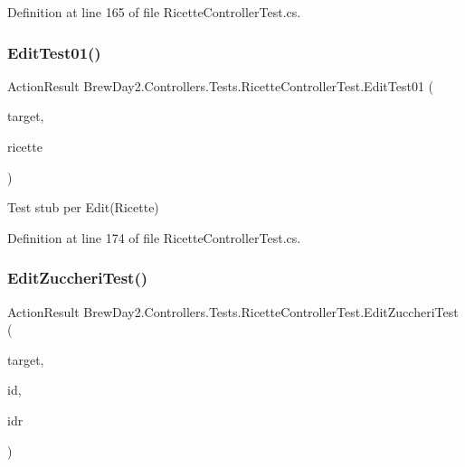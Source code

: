 Definition at line 165 of file Ricette\+Controller\+Test.\+cs.

\mbox{\label{class_brew_day2_1_1_controllers_1_1_tests_1_1_ricette_controller_test_a17ffb0513ba9d12c358fe7ef99df6918}} 
\subsubsection{\texorpdfstring{Edit\+Test01()}{EditTest01()}}
{\footnotesize\ttfamily Action\+Result Brew\+Day2.\+Controllers.\+Tests.\+Ricette\+Controller\+Test.\+Edit\+Test01 (\begin{DoxyParamCaption}\item[{\mbox{[}\+Pex\+Assume\+Under\+Test\mbox{]} \mbox{\hyperlink{class_brew_day2_1_1_controllers_1_1_ricette_controller}{Ricette\+Controller}}}]{target,  }\item[{\mbox{\hyperlink{class_brew_day2_1_1_models_1_1_ricette}{Ricette}}}]{ricette }\end{DoxyParamCaption})}



Test stub per Edit(\+Ricette)



Definition at line 174 of file Ricette\+Controller\+Test.\+cs.

\mbox{\label{class_brew_day2_1_1_controllers_1_1_tests_1_1_ricette_controller_test_ad23eef82d2d6cb0fd15d5b6dfd69e79b}} 
\subsubsection{\texorpdfstring{Edit\+Zuccheri\+Test()}{EditZuccheriTest()}}
{\footnotesize\ttfamily Action\+Result Brew\+Day2.\+Controllers.\+Tests.\+Ricette\+Controller\+Test.\+Edit\+Zuccheri\+Test (\begin{DoxyParamCaption}\item[{\mbox{[}\+Pex\+Assume\+Under\+Test\mbox{]} \mbox{\hyperlink{class_brew_day2_1_1_controllers_1_1_ricette_controller}{Ricette\+Controller}}}]{target,  }\item[{int}]{id,  }\item[{int}]{idr }\end{DoxyParamCaption})}



